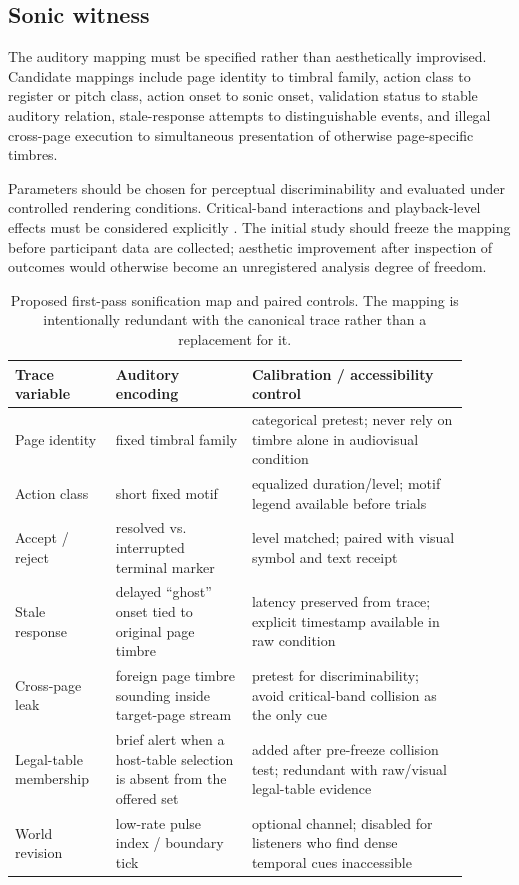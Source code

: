 \documentclass[11pt]{article}
\begin{document}
\subsection{Sonic witness}
The auditory mapping must be specified rather than aesthetically improvised. Candidate mappings include page identity to timbral family, action class to register or pitch class, action onset to sonic onset, validation status to stable auditory relation, stale-response attempts to distinguishable events, and illegal cross-page execution to simultaneous presentation of otherwise page-specific timbres.

Parameters should be chosen for perceptual discriminability and evaluated under controlled rendering conditions. Critical-band interactions and playback-level effects must be considered explicitly \citep{plomp1965tonal,katz2015mastering}. The initial study should freeze the mapping before participant data are collected; aesthetic improvement after inspection of outcomes would otherwise become an unregistered analysis degree of freedom.

\begin{table}[t]
\centering
\small
\caption{Proposed first-pass sonification map and paired controls. The mapping is intentionally redundant with the canonical trace rather than a replacement for it.}
\label{tab:sonification-map}
\begin{tabular}{p{0.20\linewidth}p{0.27\linewidth}p{0.43\linewidth}}
\toprule
Trace variable & Auditory encoding & Calibration / accessibility control \\
\midrule
Page identity & fixed timbral family & categorical pretest; never rely on timbre alone in audiovisual condition \\
Action class & short fixed motif & equalized duration/level; motif legend available before trials \\
Accept / reject & resolved vs. interrupted terminal marker & level matched; paired with visual symbol and text receipt \\
Stale response & delayed ``ghost'' onset tied to original page timbre & latency preserved from trace; explicit timestamp available in raw condition \\
Cross-page leak & foreign page timbre sounding inside target-page stream & pretest for discriminability; avoid critical-band collision as the only cue \\
Legal-table membership & brief alert when a host-table selection is absent from the offered set & added after pre-freeze collision test; redundant with raw/visual legal-table evidence \\
World revision & low-rate pulse index / boundary tick & optional channel; disabled for listeners who find dense temporal cues inaccessible \\
\bottomrule
\end{tabular}
\end{table}
\end{document}
